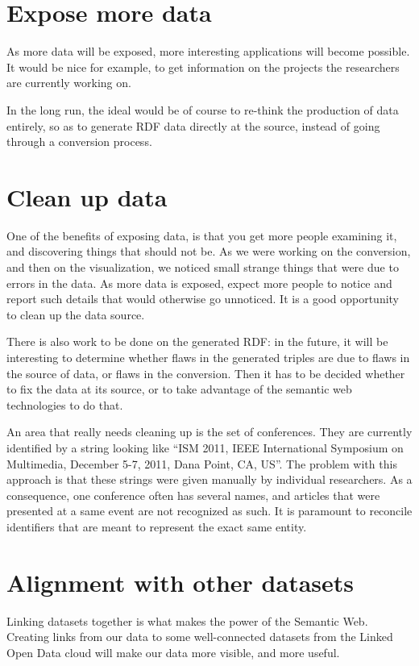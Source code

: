 \documentclass[a4paper,11pt]{report}
\begin{document}
\section*{Expose more data}
As more data will be exposed, more interesting applications will become possible. It would be nice for example, to get information on the projects the researchers are currently working on. 

In the long run, the ideal would be of course to re-think the production of data entirely, so as to generate RDF data directly at the source, instead of going through a conversion process. 

\section*{Clean up data}
One of the benefits of exposing data, is that you get more people examining it, and discovering things that should not be. As we were working on the conversion, and then on the visualization, we noticed small strange things that were due to errors in the data. As more data is exposed, expect more people to notice and report such details that would otherwise go unnoticed. It is a good opportunity to clean up the data source.

There is also work to be done on the generated RDF: in the future, it will be interesting to determine whether flaws in the generated triples are due to flaws in the source of data, or flaws in the conversion. Then it has to be decided whether to fix the data at its source, or to take advantage of the semantic web technologies to do that. 

An area that really needs cleaning up is the set of conferences. They are currently identified by a string looking like ``ISM 2011, IEEE International Symposium on Multimedia, December 5-7, 2011, Dana Point, CA, US''. The problem with this approach is that these strings were given manually by individual researchers. As a consequence, one conference often has several names, and articles that were presented at a same event are not recognized as such. It is paramount to reconcile identifiers that are meant to represent the exact same entity. 

\section*{Alignment with other datasets}
Linking datasets together is what makes the power of the Semantic Web. Creating links from our data to some well-connected datasets from the Linked Open Data cloud will make our data more visible, and more useful. 
\end{document}
